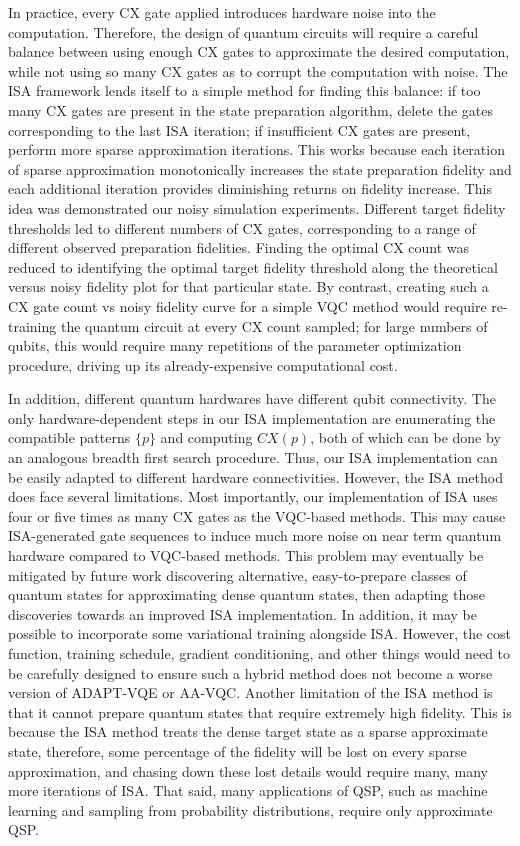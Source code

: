 In practice, every CX gate applied introduces hardware noise into the computation. 
Therefore, the design of quantum circuits will require a careful balance between 
using enough CX gates to approximate the desired computation, while not using so many 
CX gates as to corrupt the computation with noise. The ISA framework lends itself to 
a simple method for finding this balance: if too many CX gates are present in the 
state preparation algorithm, delete the gates corresponding to the last ISA 
iteration; if insufficient CX gates are present, perform more sparse approximation 
iterations. This works because each iteration of sparse approximation monotonically 
increases the state preparation fidelity and each additional iteration provides 
diminishing returns on fidelity increase. This idea was demonstrated our noisy 
simulation experiments. Different target fidelity thresholds led to different numbers 
of CX gates, corresponding to a range of different observed preparation fidelities. 
Finding the optimal CX count was reduced to identifying the optimal target fidelity 
threshold along the theoretical versus noisy fidelity plot for that particular state. 
By contrast, creating such a CX gate count vs noisy fidelity curve for a simple VQC 
method would require re-training the quantum circuit at every CX count sampled; for 
large numbers of qubits, this would require many repetitions of the parameter 
optimization procedure, driving up its already-expensive computational cost.

In addition, different quantum hardwares have different qubit connectivity. The 
only hardware-dependent steps in our ISA implementation are enumerating the 
compatible patterns $\{p\}$ and computing $CX(p)$, both of which can be done by an 
analogous breadth first search procedure. Thus, our ISA implementation can be easily 
adapted to different hardware connectivities.
However, the ISA method does face several limitations. Most importantly, our 
implementation of ISA uses four or five times as many CX gates as the VQC-based 
methods. This may cause ISA-generated gate sequences to induce much more noise on 
near term quantum hardware compared to VQC-based methods. This problem may eventually 
be mitigated by future work discovering alternative, easy-to-prepare classes of 
quantum states for approximating dense quantum states, then adapting those 
discoveries towards an improved ISA implementation. In addition, it may be possible 
to incorporate some variational training alongside ISA. However, the cost function, 
training schedule, gradient conditioning, and other things would need to be carefully 
designed to ensure such a hybrid method does not become a worse version of ADAPT-VQE 
or AA-VQC. Another limitation of the ISA method is that it cannot prepare quantum states that 
require extremely high fidelity. This is because the ISA method treats the dense 
target state as a sparse approximate state, therefore, some percentage of the 
fidelity will be lost on every sparse approximation, and chasing down these lost 
details would require many, many more iterations of ISA. That said, many applications 
of QSP, such as machine learning and sampling from probability distributions, require 
only approximate QSP.

